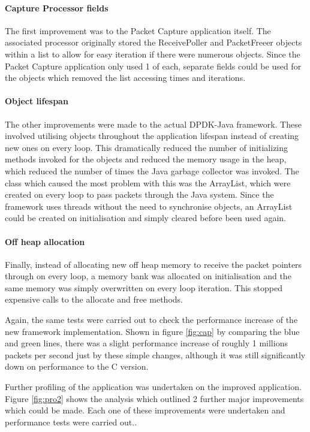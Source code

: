 \documentclass[final_report.tex]{subfiles}
\begin{document}
\paragraph*{Capture Processor fields}
The first improvement was to the Packet Capture application itself. The associated processor originally stored the ReceivePoller and PacketFreeer objects within a list to allow for easy iteration if there were numerous objects. Since the Packet Capture application only used 1 of each, separate fields could be used for the objects which removed the list accessing times and iterations.

\paragraph*{Object lifespan}
The other improvements were made to the actual DPDK-Java framework. These involved utilising objects throughout the application lifespan instead of creating new ones on every loop. This dramatically reduced the number of initializing methods invoked for the objects and reduced the memory usage in the heap, which reduced the number of times the Java garbage collector was invoked. The class which caused the most problem with this was the ArrayList, which were created on every loop to pass packets through the Java system. Since the framework uses threads without the need to synchronise objects, an ArrayList could be created on initialisation and simply cleared before been used again.

\paragraph*{Off heap allocation}
Finally, instead of allocating new off heap memory to receive the packet pointers through on every loop, a memory bank was allocated on initialisation and the same memory was simply overwritten on every loop iteration. This stopped expensive calls to the allocate and free methods.

Again, the same tests were carried out to check the performance increase of the new framework implementation. Shown in figure \ref{fig:cap} by comparing the blue and green lines, there was a slight performance increase of roughly 1 millions packets per second just by these simple changes, although it was still significantly down on performance to the C version.

Further profiling of the application was undertaken on the improved application. Figure \ref{fig:pro2} shows the analysis which outlined 2 further major improvements which could be made. Each one of these improvements were undertaken and performance tests were carried out..
\end{document}
